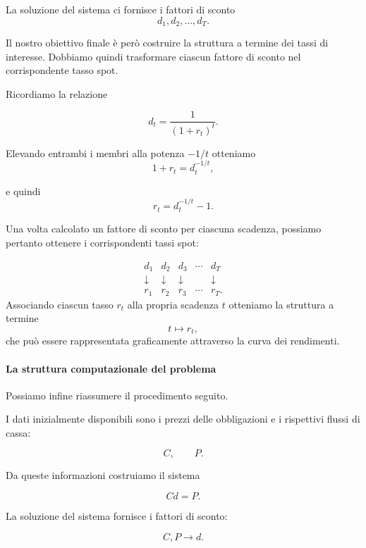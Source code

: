La soluzione del sistema ci fornisce i fattori di sconto
$$
    d_1,d_2,\ldots,d_T.
$$

Il nostro obiettivo finale è però costruire la struttura a termine
dei tassi di interesse. Dobbiamo quindi trasformare ciascun fattore
di sconto nel corrispondente tasso spot.

Ricordiamo la relazione

$$
    d_t=
    \frac{1}{(1+r_t)^t}.
$$

Elevando entrambi i membri alla potenza $-1/t$ otteniamo
$$
    1+r_t=d_t^{-1/t},
$$

e quindi
$$
    r_t=d_t^{-1/t}-1.
    \label{eq:discount-to-spot}
$$

Una volta calcolato un fattore di sconto per ciascuna scadenza,
possiamo pertanto ottenere i corrispondenti tassi spot:

\begin{equation*}
\begin{array}{ccccccc}
d_1 & d_2 & d_3 & \cdots & d_T\\
\downarrow & \downarrow & \downarrow && \downarrow\\
r_1 & r_2 & r_3 & \cdots & r_T.
\end{array}
\end{equation*}
Associando ciascun tasso $r_t$ alla propria scadenza $t$ otteniamo
la struttura a termine
$$
    t\longmapsto r_t,
$$
che può essere rappresentata graficamente attraverso la curva dei
rendimenti.

\paragraph{La struttura computazionale del problema}
Possiamo infine riassumere il procedimento seguito.

I dati inizialmente disponibili sono i prezzi delle obbligazioni
e i rispettivi flussi di cassa:

\begin{equation*}
    C,\qquad P.
\end{equation*}

Da queste informazioni costruiamo il sistema

\begin{equation*}
    Cd=P.
\end{equation*}

La soluzione del sistema fornisce i fattori di sconto:

\begin{equation*}
    C,P
    \longrightarrow
    d.
\end{equation*}

